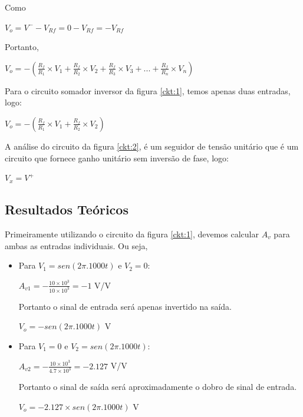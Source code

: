 Como 

\begin{center}
$V_o = V^- - V_{Rf} = 0 - V_{Rf} =-V_{Rf}  $
\end{center}


Portanto,

\begin{center}
    $V_{o} = - \left(\frac{R_f}{R_1} \times V_1 + \frac{R_f}{R_2} \times V_2 + \frac{R_f}{R_3} \times V_3 +...+ \frac{R_f}{R_n} \times V_n \right)$
\end{center}

Para o circuito somador inversor da figura \ref{ckt:1}, temos apenas duas entradas, logo:

\begin{center}
    $V_{o} = - \left(\frac{R_f}{R_1} \times V_1 + \frac{R_f}{R_2} \times V_2 \right)$
\end{center}

A análise do circuito da figura \ref{ckt:2}, é um seguidor de tensão unitário que é um circuito que fornece ganho unitário sem inversão de fase, logo:

\begin{center}
    $V_{x} = V^+$
\end{center}

\subsection{Resultados Teóricos}

Primeiramente utilizando o circuito da figura \ref{ckt:1}, devemos calcular $A_v$ para ambas as entradas individuais. Ou seja, 

\begin{itemize}
    \item Para $V_1 = sen(2\pi.1000t)$ e $V_2 = 0$:
    \begin{center}
        $A_{v1} = - \frac{10 \times 10^3}{10 \times 10^3} = - 1 $ V/V
    \end{center}
    
    Portanto o sinal de entrada será apenas invertido na saída.
    
    \begin{center}
        $V_{o} = -sen(2\pi.1000t) $ V
    \end{center}
    
    \item Para $V_1 = 0 $ e $V_2 = sen(2\pi.1000t)$:
    
    \begin{center}
        $A_{v2} = - \frac{10 \times 10^3}{4.7 \times 10^3} = - 2.127 $ V/V
    \end{center}
    
    Portanto o sinal de saída será aproximadamente o dobro de sinal de entrada.
    
    \begin{center}
        $V_{o} = -2.127 \times sen(2\pi.1000t) $ V
    \end{center}
    
\end{itemize}


